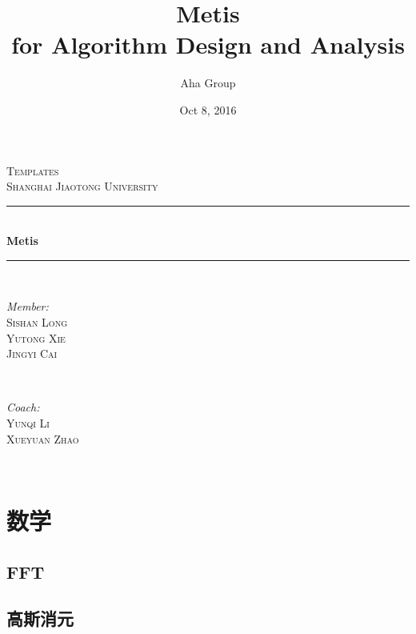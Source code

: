 \documentclass[11pt]{article}
\title{Metis \\ for Algorithm Design and Analysis}
\author{Aha Group}
\date{Oct 8, 2016}
\begin{document}
\begin{titlepage}

\newcommand{\HRule}{\rule{\linewidth}{0.5mm}}
\center
\textsc{\LARGE Templates}\\[1.5cm] 
\textsc{\Large Shanghai Jiaotong University}\\[0.5cm]
\HRule \\[0.4cm]
{ \huge \bfseries Metis}\\[0.4cm] 
\HRule \\[1.5cm]

\begin{minipage}{0.4\textwidth}
\begin{flushleft} \large
\emph{Member:}\\
 \textsc{Sishan Long \\ Yutong Xie \\ Jingyi Cai}
\end{flushleft}
\end{minipage}
~
\begin{minipage}{0.4\textwidth}
\begin{flushright} \large
\emph{Coach:} \\
\textsc{Yunqi Li \\ Xueyuan Zhao}
\end{flushright}
\end{minipage}\\[4cm]



\vfill

\end{titlepage}
	\newpage	
	
	\tableofcontents
	\newpage
	
	\section{数学}
		\subsection{FFT}
		
		\subsection{高斯消元}
		
\end{document}
